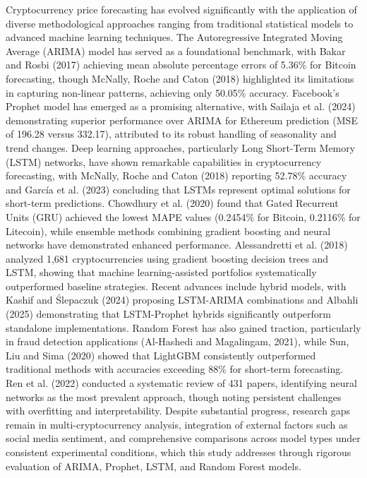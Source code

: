 \documentclass[12pt,a4paper]{report}
\begin{document}
Cryptocurrency price forecasting has evolved significantly with the application of diverse methodological 
approaches ranging from traditional statistical models to advanced machine learning techniques. 
The Autoregressive Integrated Moving Average (ARIMA) model has served as a foundational benchmark, 
with Bakar and Rosbi (2017) achieving mean absolute percentage errors of 5.36\% for Bitcoin forecasting, 
though McNally, Roche and Caton (2018) highlighted its limitations in capturing non-linear patterns, achieving 
only 50.05\% accuracy. Facebook's Prophet model has emerged as a promising alternative, with 
Sailaja et al. (2024) demonstrating superior performance over ARIMA for Ethereum prediction 
(MSE of 196.28 versus 332.17), attributed to its robust handling of seasonality and trend changes. Deep learning 
approaches, particularly Long Short-Term Memory (LSTM) networks, have shown remarkable capabilities in 
cryptocurrency forecasting, with McNally, Roche and Caton (2018) reporting 52.78\% accuracy and 
García et al. (2023) concluding that LSTMs represent optimal solutions for short-term predictions. 
Chowdhury et al. (2020) found that Gated Recurrent Units (GRU) achieved the lowest MAPE values (0.2454\% for 
Bitcoin, 0.2116\% for Litecoin), while ensemble methods combining gradient boosting and neural networks have 
demonstrated enhanced performance. Alessandretti et al. (2018) analyzed 1,681 cryptocurrencies using gradient boosting decision trees and LSTM, showing that machine learning-assisted portfolios systematically outperformed baseline strategies. Recent advances include hybrid models, with Kashif and Ślepaczuk (2024) proposing LSTM-ARIMA combinations and Albahli (2025) demonstrating that LSTM-Prophet hybrids significantly outperform standalone implementations. Random Forest has also gained traction, particularly in fraud detection applications (Al-Hashedi and Magalingam, 2021), while Sun, Liu and Sima (2020) showed that LightGBM consistently outperformed traditional methods with accuracies exceeding 88\% for short-term forecasting. Ren et al. (2022) conducted a systematic review of 431 papers, identifying neural networks as the most prevalent approach, though noting persistent challenges with overfitting and interpretability. Despite substantial progress, research gaps remain in multi-cryptocurrency analysis, integration of external factors such as social media sentiment, and comprehensive comparisons across model types under consistent experimental conditions, which this study addresses through rigorous evaluation of ARIMA, Prophet, LSTM, and Random Forest models.
\end{document}
